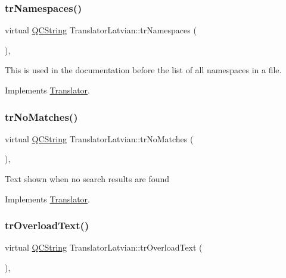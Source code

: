 \subsubsection{\texorpdfstring{trNamespaces()}{trNamespaces()}}
{\footnotesize\ttfamily virtual \mbox{\hyperlink{class_q_c_string}{Q\+C\+String}} Translator\+Latvian\+::tr\+Namespaces (\begin{DoxyParamCaption}{ }\end{DoxyParamCaption})\hspace{0.3cm}{\ttfamily [inline]}, {\ttfamily [virtual]}}

This is used in the documentation before the list of all namespaces in a file. 

Implements \mbox{\hyperlink{class_translator}{Translator}}.

\mbox{\label{class_translator_latvian_a7b78bee9e9c1dcbed020df9810d2ede7}} 
\subsubsection{\texorpdfstring{trNoMatches()}{trNoMatches()}}
{\footnotesize\ttfamily virtual \mbox{\hyperlink{class_q_c_string}{Q\+C\+String}} Translator\+Latvian\+::tr\+No\+Matches (\begin{DoxyParamCaption}{ }\end{DoxyParamCaption})\hspace{0.3cm}{\ttfamily [inline]}, {\ttfamily [virtual]}}

Text shown when no search results are found 

Implements \mbox{\hyperlink{class_translator}{Translator}}.

\mbox{\label{class_translator_latvian_a93f8a85f04b8fc4930f134753e0ca761}} 
\subsubsection{\texorpdfstring{trOverloadText()}{trOverloadText()}}
{\footnotesize\ttfamily virtual \mbox{\hyperlink{class_q_c_string}{Q\+C\+String}} Translator\+Latvian\+::tr\+Overload\+Text (\begin{DoxyParamCaption}{ }\end{DoxyParamCaption})\hspace{0.3cm}{\ttfamily [inline]}, {\ttfamily [virtual]}}

